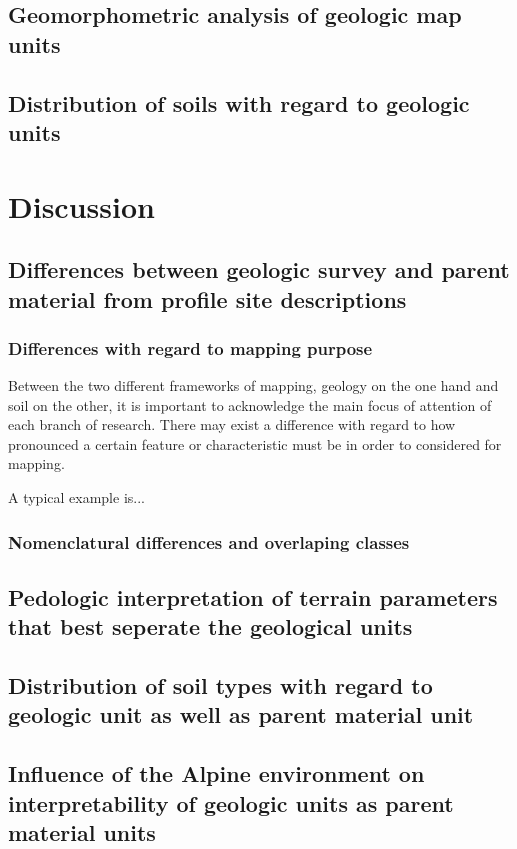 \documentclass[preprint,12pt,authoryear]{elsarticle}
\begin{document}
\subsection{Geomorphometric analysis of geologic map units}
\subsection{Distribution of soils with regard to geologic units}


\section{Discussion}
\subsection{Differences between geologic survey and parent material from profile site descriptions}
\subsubsection{Differences with regard to mapping purpose}
Between the two different frameworks of mapping, geology on the one hand and soil on the other, it is important to acknowledge the main focus of attention of each branch of research. There may exist a difference with regard to how pronounced a certain feature or characteristic must be in order to considered for mapping. 

A typical example is...


\subsubsection{Nomenclatural differences and overlaping classes}


\subsection{Pedologic interpretation of terrain parameters that best seperate the geological units}

\subsection{Distribution of soil types with regard to geologic unit as well as parent material unit}

\subsection{Influence of the Alpine environment on interpretability of geologic units as parent material units}
\end{document}
